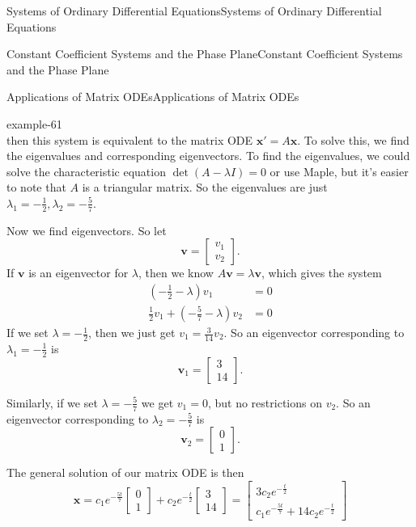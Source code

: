 \documentclass[10pt,]{book}
\numberwithin{equation}{section}
\renewcommand{\vec}[1]{\mathbf{#1}}
\newcommand{\amp}{&}
\begin{document}
\begin{chapterptx}{Systems of Ordinary Differential Equations}{}{Systems of Ordinary Differential Equations}{}{}
\begin{sectionptx}{Constant Coefficient Systems and the Phase Plane}{}{Constant Coefficient Systems and the Phase Plane}{}{}
\begin{subsectionptx}{Applications of Matrix ODEs}{}{Applications of Matrix ODEs}{}{}
\begin{example}{}{example-61}
\begin{equation*}
\end{equation*}
then this system is equivalent to the matrix ODE \(\vec{x}' = A\vec{x}\). To solve this, we find the eigenvalues and corresponding eigenvectors. To find the eigenvalues, we could solve the characteristic equation \(\det(A-\lambda I) = 0\) or use Maple, but it's easier to note that \(A\) is a triangular matrix. So the eigenvalues are just \(\lambda_{1} = -\frac{1}{2},\lambda_{2} = -\frac{5}{7}\).%
\par
\hypertarget{p-362}{}%
Now we find eigenvectors. So let%
\begin{equation*}
\vec{v} = \begin{bmatrix}v_{1} \\ v_{2}\end{bmatrix}.
\end{equation*}
If \(\vec{v}\) is an eigenvector for \(\lambda\), then we know \(A\vec{v} = \lambda\vec{v}\), which gives the system%
\begin{align*}
(-\frac{1}{2}-\lambda)v_{1} \amp = 0\\
\frac{1}{2}v_{1} + (-\frac{5}{7}-\lambda)v_{2} \amp = 0
\end{align*}
If we set \(\lambda=-\frac{1}{2}\), then we just get \(v_{1} = \frac{3}{14}v_{2}\). So an eigenvector corresponding to \(\lambda_{1} = -\frac{1}{2}\) is%
\begin{equation*}
\vec{v}_{1} = \begin{bmatrix}3\\14\end{bmatrix}.
\end{equation*}
%
\par
\hypertarget{p-363}{}%
Similarly, if we set \(\lambda=-\frac{5}{7}\) we get \(v_{1} = 0\), but no restrictions on \(v_{2}\). So an eigenvector corresponding to \(\lambda_{2} = -\frac{5}{7}\) is%
\begin{equation*}
\vec{v}_{2} = \begin{bmatrix}0\\1\end{bmatrix}.
\end{equation*}
%
\par
\hypertarget{p-364}{}%
The general solution of our matrix ODE is then%
\begin{equation*}
\vec{x} = c_{1}e^{-\frac{5t}{7}}\begin{bmatrix}0\\1\end{bmatrix} + c_{2}e^{-\frac{t}{2}}\begin{bmatrix}3\\14\end{bmatrix} = \begin{bmatrix}3c_{2}e^{-\frac{t}{2}} \\ c_{1}e^{-\frac{5t}{7}}+14c_{2}e^{-\frac{t}{2}}\end{bmatrix}

\end{equation*}
\end{example}
\end{subsectionptx}
\end{sectionptx}
\end{chapterptx}
\end{document}
